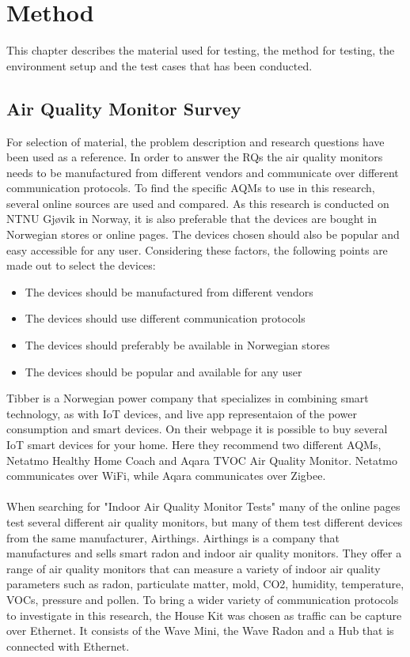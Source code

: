\chapter*{Method}
This chapter describes the material used for testing, the method for testing, the environment setup and the test cases that has been conducted. 
\section*{Air Quality Monitor Survey}
For selection of material, the problem description and research questions have been used as a reference. In order to answer the RQs the air quality monitors needs to be manufactured from different vendors and communicate over different communication protocols. To find the specific AQMs to use in this research, several online sources are used and compared. As this research is conducted on NTNU Gjøvik in Norway, it is also preferable that the devices are bought in Norwegian stores or online pages. The devices chosen should also be popular and easy accessible for any user. Considering these factors, the following points are made out to select the devices:
\begin{itemize}
    \item The devices should be manufactured from different vendors
    \item The devices should use different communication protocols
    \item The devices should preferably be available in Norwegian stores
    \item The devices should be popular and available for any user
\end{itemize}
Tibber \cite{Tibber} is a Norwegian power company that specializes in combining smart technology, as with IoT devices, and live app representaion of the power consumption and smart devices. \cite{Tibber} On their webpage it is possible to buy several IoT smart devices for your home. Here they recommend two different AQMs, Netatmo Healthy Home Coach and Aqara TVOC Air Quality Monitor. Netatmo communicates over WiFi, while Aqara communicates over Zigbee. 
\\\\
When searching for "Indoor Air Quality Monitor Tests" many of the online pages test several different air quality monitors, but many of them test different devices from the same manufacturer, Airthings. \cite{AQMTest1} \cite{AQMTest2} \cite{AQMTest3} Airthings \cite{Airthings} is a company that manufactures and sells smart radon and indoor air quality monitors. They offer a range of air quality monitors that can measure a variety of indoor air quality parameters such as radon, particulate matter, mold, CO2, humidity, temperature, VOCs, pressure and pollen. \cite{AirthingsProducts} To bring a wider variety of communication protocols to investigate in this research, the House Kit was chosen as traffic can be capture over Ethernet. It consists of the Wave Mini, the Wave Radon and a Hub that is connected with Ethernet. \cite{AirthingsProducts}
